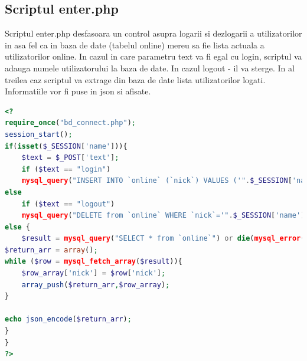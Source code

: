 \documentclass[12pt]{article}
\begin{document}
\subsection{Scriptul enter.php}
Scriptul enter.php desfasoara un control asupra logarii si dezlogarii a utilizatorilor in asa fel ca in baza de date (tabelul online) mereu sa fie lista actuala a utilizatorilor online.
	In cazul in care parametru text va fi egal cu login, scriptul va adauga numele utilizatorului la baza de date. In cazul logout - il va sterge. In al treilea caz scriptul va extrage din baza de date lista utilizatorilor logati. Informatiile vor fi puse in json si afisate.
\newpage
\begin{lstlisting}[language=php, caption={Fisierul enter.php}, label=list2]
<?
require_once("bd_connect.php");
session_start();
if(isset($_SESSION['name'])){
    $text = $_POST['text'];
    if ($text == "login")
    mysql_query("INSERT INTO `online` (`nick`) VALUES ('".$_SESSION['name']."')");
else
	if ($text == "logout")
	mysql_query("DELETE from `online` WHERE `nick`='".$_SESSION['name']."'");
else {
	$result = mysql_query("SELECT * from `online`") or die(mysql_error());
$return_arr = array();
while ($row = mysql_fetch_array($result)){
	$row_array['nick'] = $row['nick'];
	array_push($return_arr,$row_array);
}

echo json_encode($return_arr);
}
}
?>\end{lstlisting}
\end{document}
